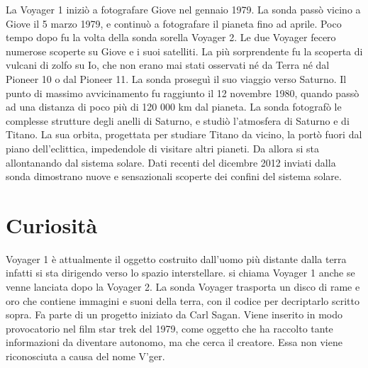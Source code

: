 \documentclass[12pt,a4paper]{article}
\begin{document}
La Voyager 1 iniziò a fotografare Giove nel gennaio 1979. La sonda passò vicino a Giove il 5 marzo 1979, e continuò a fotografare il pianeta fino ad aprile. Poco tempo dopo fu la volta della sonda sorella Voyager 2. Le due Voyager fecero numerose scoperte su Giove e i suoi satelliti. La più sorprendente fu la scoperta di vulcani di zolfo su Io, che non erano mai stati osservati né da Terra né dal Pioneer 10 o dal Pioneer 11.
La sonda proseguì il suo viaggio verso Saturno. Il punto di massimo avvicinamento fu raggiunto il 12 novembre 1980, quando passò ad una distanza di poco più di 120 000 km dal pianeta. La sonda fotografò le complesse strutture degli anelli di Saturno, e studiò l'atmosfera di Saturno e di Titano. La sua orbita, progettata per studiare Titano da vicino, la portò fuori dal piano dell'eclittica, impedendole di visitare altri pianeti. Da allora si sta allontanando dal sistema solare.
Dati recenti del dicembre 2012 inviati dalla sonda dimostrano nuove e sensazionali scoperte dei confini del sistema solare.

\section*{Curiosità}
\label{curiosit}

Voyager 1 è attualmente il oggetto costruito dall'uomo più distante dalla terra infatti si sta dirigendo verso lo spazio interstellare. si chiama Voyager 1 anche se venne lanciata dopo la Voyager 2.
La sonda Voyager trasporta un disco di rame e oro che contiene immagini e suoni della terra, con il codice per decriptarlo scritto sopra.
Fa parte di un progetto iniziato da Carl Sagan.
Viene inserito in modo provocatorio nel film star trek del 1979, come oggetto che ha raccolto tante informazioni da diventare autonomo, ma che cerca il creatore. Essa non viene riconosciuta a causa del nome V'ger.
\end{document}
